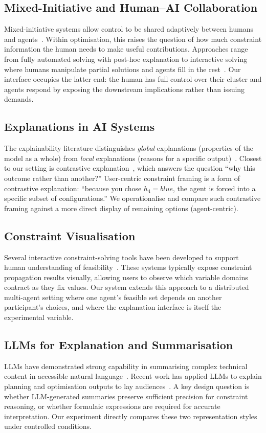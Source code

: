 \documentclass[10pt]{article}
\theoremstyle{definition}
\begin{document}
\subsection{Mixed-Initiative and Human--AI Collaboration}
Mixed-initiative systems allow control to be shared adaptively between humans and
agents~\citep{horvitz1999principles}.  Within optimisation, this raises the question of how much
constraint information the human needs to make useful contributions.  Approaches range from
fully automated solving with post-hoc explanation to interactive solving where humans manipulate
partial solutions and agents fill in the rest~\citep{green2019humanintheloop}.  Our interface
occupies the latter end: the human has full control over their cluster and agents respond by
exposing the downstream implications rather than issuing demands.

\subsection{Explanations in AI Systems}
The explainability literature distinguishes \emph{global} explanations (properties of the model
as a whole) from \emph{local} explanations (reasons for a specific output)~\citep{ribeiro2016why}.
Closest to our setting is contrastive explanation~\citep{miller2019explanation}, which answers the
question ``why this outcome rather than another?''  User-centric constraint framing is a form of
contrastive explanation: ``because you chose $h_4 = \textit{blue}$, the agent is forced into a
specific subset of configurations.''  We operationalise and compare such contrastive framing
against a more direct display of remaining options (agent-centric).

\subsection{Constraint Visualisation}
Several interactive constraint-solving tools have been developed to support human understanding of
feasibility~\citep{borning1997constraint,freuder2003progress}.  These systems typically expose
constraint propagation results visually, allowing users to observe which variable domains contract
as they fix values.  Our system extends this approach to a distributed multi-agent setting where
one agent's feasible set depends on another participant's choices, and where the explanation
interface is itself the experimental variable.

\subsection{LLMs for Explanation and Summarisation}
LLMs have demonstrated strong capability in summarising complex technical content in accessible
natural language~\citep{brown2020language}.  Recent work has applied LLMs to explain planning
and optimisation outputs to lay audiences~\citep{guo2025castl}.  A key design question is
whether LLM-generated summaries preserve sufficient precision for constraint reasoning, or whether
formulaic expressions are required for accurate interpretation.  Our experiment directly compares
these two representation styles under controlled conditions.
\end{document}
